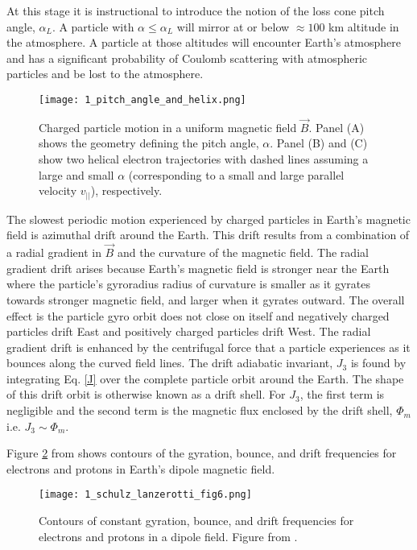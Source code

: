 At this stage it is instructional to introduce the notion of the loss cone pitch angle, $\alpha_L$.  A particle with $\alpha \leq \alpha_L$ will mirror at or below $\approx 100$ km altitude in the atmosphere. A particle at those altitudes will encounter Earth's atmosphere and has a significant probability of Coulomb scattering with atmospheric particles and be lost to the atmosphere.

\begin{figure}
\texttt{[image: 1\_pitch\_angle\_and\_helix.png]}
\caption{Charged particle motion in a uniform magnetic field $\vec{B}$. Panel (A) shows the geometry defining the pitch angle, $\alpha$. Panel (B) and (C) show two helical electron trajectories with dashed lines assuming a large and small $\alpha$ (corresponding to a small and large parallel velocity $v_{||}$), respectively.}
\label{Intro:pa}
\end{figure}

The slowest periodic motion experienced by charged particles in Earth's magnetic field is azimuthal drift around the Earth. This drift results from a combination of a radial gradient in $\vec{B}$ and the curvature of the magnetic field. The radial gradient drift arises because Earth's magnetic field is stronger near the Earth where the particle's gyroradius radius of curvature is smaller as it gyrates towards stronger magnetic field, and larger when it gyrates outward. The overall effect is the particle gyro orbit does not close on itself and negatively charged particles drift East and positively charged particles drift West. The radial gradient drift is enhanced by the centrifugal force that a particle experiences as it bounces along the curved field lines. The drift adiabatic invariant, $J_3$ is found by integrating Eq. \ref{J} over the complete particle orbit around the Earth. The shape of this drift orbit is otherwise known as a drift shell. For $J_3$, the first term is negligible and the second term is the magnetic flux enclosed by the drift shell, $\Phi_m$  i.e. $J_3 \sim \Phi_m$. 

Figure \ref{Intro:adiabatic_frequencies} from \citet{Schulz1974} shows contours of the gyration, bounce, and drift frequencies for electrons and protons in Earth's dipole magnetic field. 

\begin{figure}
\texttt{[image: 1\_schulz\_lanzerotti\_fig6.png]}
\caption{Contours of constant gyration, bounce, and drift frequencies for electrons and protons in a dipole field. Figure from \citet{Schulz1974}.}
\label{Intro:adiabatic_frequencies}
\end{figure}

